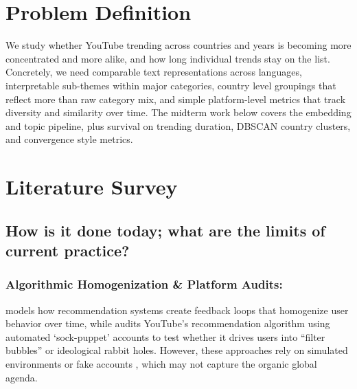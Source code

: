 \documentclass[sigconf,11pt]{acmart}
\begin{document}

\section{Problem Definition}
We study whether YouTube trending across countries and years is becoming more concentrated and more alike, and how long individual trends stay on the list. Concretely, we need comparable text representations across languages, interpretable sub-themes within major categories, country level groupings that reflect more than raw category mix, and simple platform-level metrics that track diversity and similarity over time. The midterm work below covers the embedding and topic pipeline, plus survival on trending duration, DBSCAN country clusters, and convergence style metrics.

\section{Literature Survey}
\subsection{How is it done today; what are the limits of current practice?}
\subsubsection{Algorithmic Homogenization \& Platform Audits: }
\hspace{1pt} \cite{Chaney_2018} models how recommendation systems create feedback loops that homogenize user behavior over time, while \cite{doi:10.1073/pnas.2213020120} audits YouTube's recommendation algorithm using automated `sock-puppet' accounts to test whether it drives users into ``filter bubbles'' or ideological rabbit holes. However, these approaches rely on simulated environments \cite{Chaney_2018} or fake accounts \cite{doi:10.1073/pnas.2213020120}, which may not capture the organic global agenda.
\end{document}
